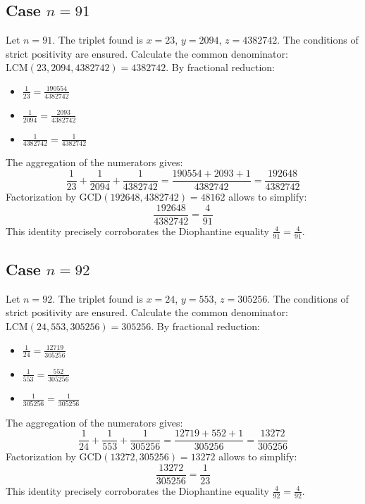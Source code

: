 \documentclass[11pt,a4paper]{article}
\begin{document}
\subsection{Case $n = 91$}
Let $n = 91$. The triplet found is $x = 23$, $y = 2094$, $z = 4382742$.
The conditions of strict positivity are ensured.
Calculate the common denominator: $\text{LCM}(23, 2094, 4382742) = 4382742$.
By fractional reduction:
\begin{itemize}
    \item $\frac{1}{23} = \frac{190554}{4382742}$
    \item $\frac{1}{2094} = \frac{2093}{4382742}$
    \item $\frac{1}{4382742} = \frac{1}{4382742}$
\end{itemize}
The aggregation of the numerators gives:
$$ \frac{1}{23} + \frac{1}{2094} + \frac{1}{4382742} = \frac{190554 + 2093 + 1}{4382742} = \frac{192648}{4382742} $$
Factorization by $\text{GCD}(192648, 4382742) = 48162$ allows to simplify:
$$ \frac{192648}{4382742} = \frac{4}{91} $$
This identity precisely corroborates the Diophantine equality $\frac{4}{91} = \frac{4}{91}$.

\subsection{Case $n = 92$}
Let $n = 92$. The triplet found is $x = 24$, $y = 553$, $z = 305256$.
The conditions of strict positivity are ensured.
Calculate the common denominator: $\text{LCM}(24, 553, 305256) = 305256$.
By fractional reduction:
\begin{itemize}
    \item $\frac{1}{24} = \frac{12719}{305256}$
    \item $\frac{1}{553} = \frac{552}{305256}$
    \item $\frac{1}{305256} = \frac{1}{305256}$
\end{itemize}
The aggregation of the numerators gives:
$$ \frac{1}{24} + \frac{1}{553} + \frac{1}{305256} = \frac{12719 + 552 + 1}{305256} = \frac{13272}{305256} $$
Factorization by $\text{GCD}(13272, 305256) = 13272$ allows to simplify:
$$ \frac{13272}{305256} = \frac{1}{23} $$
This identity precisely corroborates the Diophantine equality $\frac{4}{92} = \frac{4}{92}$.
\end{document}
